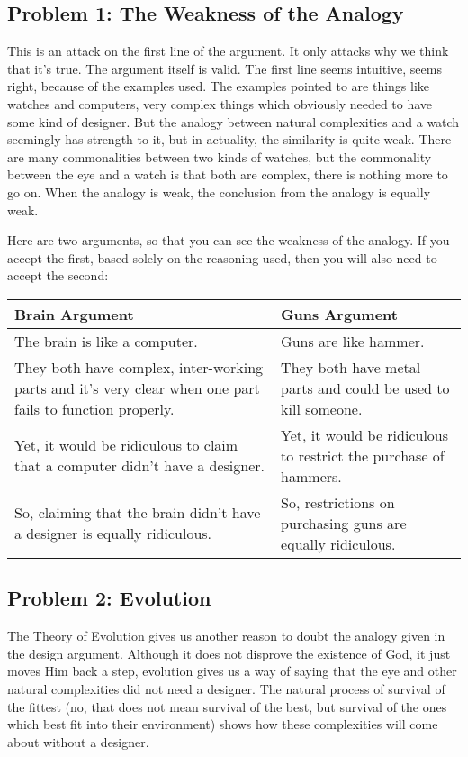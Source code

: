 \subsection{Problem 1: The Weakness of the Analogy}

This is an attack on the first line of the argument. It only attacks why we think that it’s true. The argument itself is valid. The first line seems intuitive, seems right, because of the examples used. The examples pointed to are things like watches and computers, very complex things which obviously needed to have some kind of designer. But the analogy between natural complexities and a watch seemingly has strength to it, but in actuality, the similarity is quite weak. There are many commonalities between two kinds of watches, but the commonality between the eye and a watch is that both are complex, there is nothing more to go on. When the analogy is weak, the conclusion from the analogy is equally weak.

Here are two arguments, so that you can see the weakness of the analogy. If you accept the first, based solely on the reasoning used, then you will also need to accept the second:
\noindent
\begin{tabular}{p{2.75in}|p{2.75in}}
Brain Argument&Guns Argument\\\hline
    The brain is like a computer.&Guns are like hammer.\\
    They both have complex, inter-working parts and it’s very clear when one part fails to function properly.&They both have metal parts and could be used to kill someone.\\
    Yet, it would be ridiculous to claim that a computer didn’t have a designer.&Yet, it would be ridiculous to restrict the purchase of hammers.\\
    So, claiming that the brain didn’t have a designer is equally ridiculous.&So, restrictions on purchasing guns are equally ridiculous.
\end{tabular}

\subsection{Problem 2: Evolution}

The Theory of Evolution gives us another reason to doubt the analogy given in the design argument. Although it does not disprove the existence of God, it just moves Him back a step, evolution gives us a way of saying that the eye and other natural complexities did not need a designer. The natural process of survival of the fittest (no, that does not mean survival of the best, but survival of the ones which best fit into their environment) shows how these complexities will come about without a designer.

